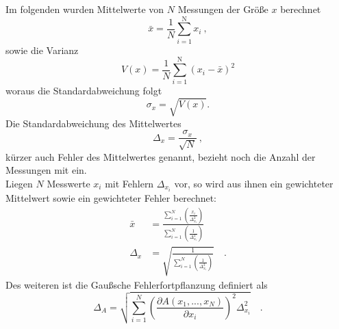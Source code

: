Im folgenden wurden Mittelwerte von $N$ Messungen der Größe $x$ berechnet
\begin{equation}
\bar{x} =  \frac{1}{N} \sum_{i=1}^\text{N} x_i \ ,
\end{equation}
sowie die Varianz
\begin{equation}
V(x) = \frac{1}{N} \sum_{i=1}^\text{N} (x_i - \bar{x})^2
\end{equation}
woraus die Standardabweichung folgt
\begin {equation}
\sigma_x = \sqrt{V(x)}.
\end{equation}
Die Standardabweichung des Mittelwertes
\begin{equation}
\Delta_{x} = \frac{\sigma_x}{\sqrt{N}} \ ,
\end{equation}
kürzer auch Fehler des Mittelwertes genannt, bezieht noch die Anzahl der Messungen mit ein. \\
Liegen $N$ Messwerte $x_i$ mit Fehlern $\Delta_{x_i}$ vor, so wird aus ihnen ein gewichteter Mittelwert sowie ein gewichteter Fehler berechnet:
\begin{align}
	\bar{x} &= \frac{\sum_{i=1}^N \left(\frac{x_i}{\Delta_{x_i}^2} \right)}{\sum_{i=1}^N \left(\frac{1}{\Delta_{x_i}^2} \right)} \\
	\Delta_x &= \sqrt{\frac{1}{{\sum_{i=1}^N \left(\frac{1}{\Delta_{x_i}^2} \right)}}} \quad .
\end{align}
Des weiteren ist die Gaußsche Fehlerfortpflanzung definiert als
\begin{equation}
\Delta_A = \sqrt{ \sum_{i=1}^N  \left(   \frac{\partial A(x_1, ... ,x_N)}{\partial x_i} \right)^2 \Delta_{x_i} ^2 } \quad .
\end{equation}